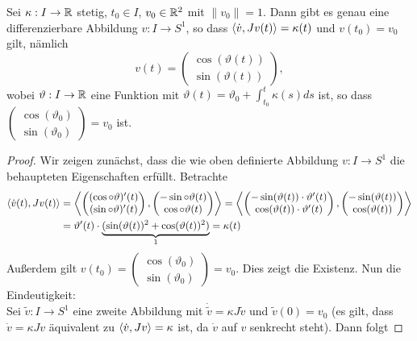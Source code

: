 \documentclass[11pt]{scrbook}
\begin{document}
\begin{lem}
\label{3.6}
Sei $\kappa: I \to \mathbb{R}$ stetig, $t_0 \in I$, $v_0 \in \mathbb{R}^2$ mit $\| v_0 \| = 1$. Dann gibt es genau eine differenzierbare Abbildung $ v: I \to S^1$, so dass $\langle \dot v, J v(t) \rangle = \kappa(t)$ und $v(t_0) = v_0$ gilt, nämlich
\[ v(t) = \begin{pmatrix} \cos(\vartheta(t)) \\ \sin(\vartheta(t)) \end{pmatrix}, \]
wobei $\vartheta: I \to \mathbb{R}$ eine Funktion mit $\vartheta(t) = \vartheta_0 + \int_{t_0}^t \kappa(s) ds$ ist, so dass $\begin{pmatrix} \cos(\vartheta_0) \\ \sin(\vartheta_0) \end{pmatrix} = v_0$ ist.
\begin{proof}
Wir zeigen zunächst, dass die wie oben definierte Abbildung $v: I \to S^1$ die behaupteten Eigenschaften erfüllt. Betrachte
\begin{align*}
\langle \dot v(t) , J v(t) \rangle &= \left \langle \begin{pmatrix} (\cos \circ \vartheta)' (t) \\ (\sin \circ \vartheta)'(t) \end{pmatrix} , \begin{pmatrix} - \sin \circ \vartheta (t) \\ \cos \circ \vartheta (t) \end{pmatrix} \right \rangle = \left \langle \begin{pmatrix}-\sin(\vartheta (t)) \cdot \vartheta'(t) \\ \cos(\vartheta(t)) \cdot \vartheta'(t) \end{pmatrix} , \begin{pmatrix} - \sin(\vartheta (t)) \\ \cos(\vartheta (t)) \end{pmatrix} \right \rangle \\
&= \vartheta'(t) \cdot \underbrace{(\sin(\vartheta(t))^2 + \cos(\vartheta(t))^2)}_1 = \kappa(t) 
\end{align*}
Außerdem gilt $v(t_0) = \begin{pmatrix} \cos(\vartheta_0) \\ \sin(\vartheta_0) \end{pmatrix} = v_0$. Dies zeigt die Existenz. Nun die Eindeutigkeit: \\
Sei $\tilde v: I \to S^1$ eine zweite Abbildung mit $\dot{\tilde v} = \kappa J \tilde v$ und $\tilde v (0) = v_0$ (es gilt, dass $\dot v = \kappa J v$ äquivalent zu $\langle \dot v, J v \rangle = \kappa$ ist, da $\dot v$ auf $v$ senkrecht steht). Dann folgt

\end{proof}
\end{lem}
\end{document}
